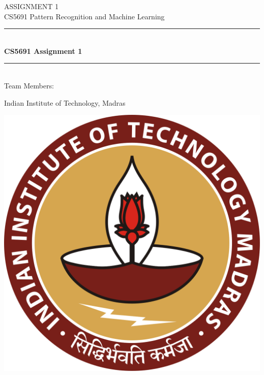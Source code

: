 \documentclass[12pt,a4paper]{article}
\begin{document}
    \begin{titlepage} 
        \begin{center}
        \large{ASSIGNMENT 1}\\
        \vspace{2em}
        \large {CS5691 Pattern Recognition and Machine Learning}
        \vspace{3em}
        
        \rule{0.9\linewidth}{0.5mm} \\[0.4cm]
        {\Large{\bfseries{CS5691 Assignment 1}}} \\
        \rule{0.9\linewidth}{0.5mm} \\[3 em]    
        
        Team Members: \\
        \vspace{0.5em}
        

        \vspace{1em}

        Indian Institute of Technology, Madras\\    
        
        \vspace{5em}    
        
            \includegraphics[scale = 0.09]{images/iitmlogo.png}
        \end{center}
    \end{titlepage}
{\hypersetup{linkcolor=black}
\tableofcontents}
\break
\end{document}
